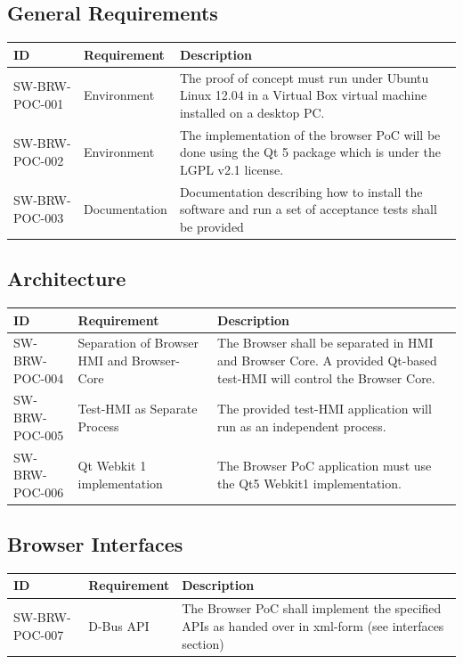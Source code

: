\documentclass{pelagicore}
\begin{document}
\subsection{General Requirements}
\begin{tabularx}{\textwidth}{| p{4em} | p{6.5em} | X |}
    \hline
    \rowcolor{blue}
    \bf ID & \bf Requirement & \bf Description \\
    \hline
    SW-BRW-POC-001 & Environment   & The proof of concept must run under Ubuntu
                                     Linux 12.04 in a Virtual Box virtual
                                     machine installed on a desktop PC. \\
    \hline
    SW-BRW-POC-002 & Environment   & The implementation of the browser PoC will
                                     be done using the Qt 5 package which is
                                     under the LGPL v2.1 license. \\
    \hline
    SW-BRW-POC-003 & Documentation & Documentation describing how to install
                                     the software and run a set of acceptance
                                     tests shall be provided \\
    \hline
\end{tabularx}

\subsection{Architecture}
\begin{tabularx}{\textwidth}{|p{4em} | p{6.5em} | X |}
    \hline
    \rowcolor{blue}
    \bf ID & \bf Requirement & \bf Description \\
    \hline
    SW-BRW-POC-004 & Separation of Browser HMI and Browser-Core &
        The Browser shall be separated in HMI and Browser Core.
        A provided Qt-based test-HMI will control the Browser Core. \\
    \hline
    SW-BRW-POC-005 & Test-HMI as Separate Process &
        The provided test-HMI application will run as an independent process.\\
    \hline
    SW-BRW-POC-006 & Qt Webkit 1 implementation &
        The Browser PoC application must use the Qt5 Webkit1 implementation.\\
    \hline
\end{tabularx}

\subsection{Browser Interfaces}
\begin{tabularx}{\textwidth}{|p{4em} | p{6.5em} | X |}
    \hline
    \rowcolor{blue}
    \bf ID & \bf Requirement & \bf Description \\
    \hline
    SW-BRW-POC-007 & D-Bus API & The Browser PoC shall implement the specified
                                 APIs as handed over in xml-form (see
                                 interfaces section)\\
    \hline
\end{tabularx}
\end{document}
